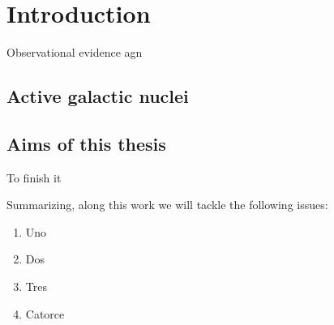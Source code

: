 
\chapter{Introduction} 
\label{chap:intro}

Observational evidence agn

\section{Active galactic nuclei}
\label{sec1:agn}
 




\section{Aims of this thesis}

To finish it


Summarizing, along this work we will tackle the following issues:
\begin{enumerate}
 \item Uno

 \item Dos

 \item Tres

 \item Catorce
\end{enumerate}

